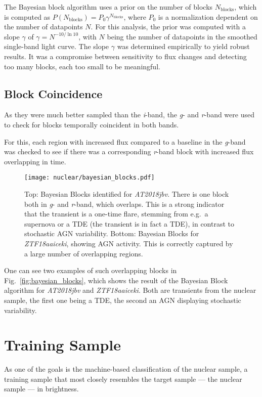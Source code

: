 The Bayesian block algorithm uses a prior on the number of blocks $N_\text{blocks}$, which is computed as $P(N_\text{blocks})= P_0 \gamma^{N_\text{blocks}} $, where $P_0$ is a normalization dependent on the number of datapoints $N$. For this analysis, the prior was computed with a slope $\gamma$ of $\gamma = N ^{-10/\ln{10}} $, with $N$ being the number of datapoints in the smoothed single-band light curve. The slope $\gamma$ was determined empirically to yield robust results. It was a compromise between sensitivity to flux changes and detecting too many blocks, each too small to be meaningful.

\subsection{Block Coincidence}
As they were much better sampled than the \textit{i}-band, the \textit{g}- and \textit{r}-band were used to check for blocks temporally coincident in both bands.

For this, each region with increased flux compared to a baseline in the \textit{g}-band was checked to see if there was a corresponding \textit{r}-band block with increased flux overlapping in time.

\begin{figure}
  \texttt{[image: nuclear/bayesian\_blocks.pdf]}
  \caption[Bayesian blocks]{Top: Bayesian Blocks identified for \textit{AT2018jbv}. There is one block both in \textit{g}- and \textit{r}-band, which overlaps. This is a strong indicator that the transient is a one-time flare, stemming from e.g.~a supernova or a TDE (the transient is in fact a TDE), in contrast to stochastic AGN variability. Bottom: Bayesian Blocks for \textit{ZTF18aaiceki}, showing AGN activity. This is correctly captured by a large number of overlapping regions.}
\end{figure}

One can see two examples of such overlapping blocks in Fig.~\ref{fig:bayesian_blocks}, which shows the result of the Bayesian Block algorithm for \textit{AT2018jbv} and \textit{ZTF18aaiceki}. Both are transients from the nuclear sample, the first one being a TDE, the second an AGN displaying stochastic variability.

\section{Training Sample}
As one of the goals is the machine-based classification of the nuclear sample, a training sample that most closely resembles the target sample --- the nuclear sample --- in brightness.


